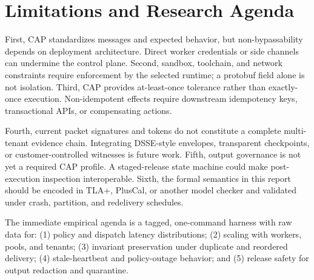 \section{Limitations and Research Agenda}

First, CAP standardizes messages and expected behavior, but non-bypassability depends on deployment architecture. Direct worker credentials or side channels can undermine the control plane. Second, sandbox, toolchain, and network constraints require enforcement by the selected runtime; a protobuf field alone is not isolation. Third, CAP provides at-least-once tolerance rather than exactly-once execution. Non-idempotent effects require downstream idempotency keys, transactional APIs, or compensating actions.

Fourth, current packet signatures and tokens do not constitute a complete multi-tenant evidence chain. Integrating DSSE-style envelopes, transparent checkpoints, or customer-controlled witnesses is future work. Fifth, output governance is not yet a required CAP profile. A staged-release state machine could make post-execution inspection interoperable. Sixth, the formal semantics in this report should be encoded in TLA+, PlusCal, or another model checker and validated under crash, partition, and redelivery schedules.

The immediate empirical agenda is a tagged, one-command harness with raw data for: (1) policy and dispatch latency distributions; (2) scaling with workers, pools, and tenants; (3) invariant preservation under duplicate and reordered delivery; (4) stale-heartbeat and policy-outage behavior; and (5) release safety for output redaction and quarantine.
